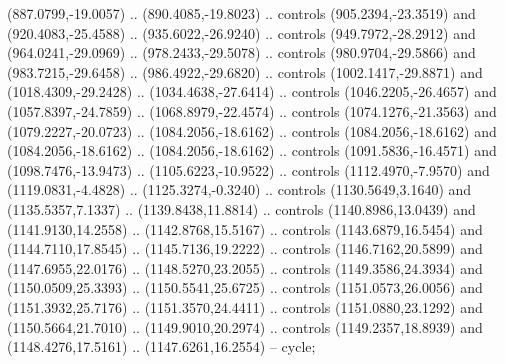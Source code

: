\begin{scope}[shift={(-22.88722,-49.76189)}]
\begin{scope}[shift={(-739.46591,328.36782)}]
      (887.0799,-19.0057) .. (890.4085,-19.8023) .. controls (905.2394,-23.3519) and
      (920.4083,-25.4588) .. (935.6022,-26.9240) .. controls (949.7972,-28.2912) and
      (964.0241,-29.0969) .. (978.2433,-29.5078) .. controls (980.9704,-29.5866) and
      (983.7215,-29.6458) .. (986.4922,-29.6820) .. controls (1002.1417,-29.8871)
      and (1018.4309,-29.2428) .. (1034.4638,-27.6414) .. controls
      (1046.2205,-26.4657) and (1057.8397,-24.7859) .. (1068.8979,-22.4574) ..
      controls (1074.1276,-21.3563) and (1079.2227,-20.0723) .. (1084.2056,-18.6162)
      .. controls (1084.2056,-18.6162) and (1084.2056,-18.6162) ..
      (1084.2056,-18.6162) .. controls (1091.5836,-16.4571) and (1098.7476,-13.9473)
      .. (1105.6223,-10.9522) .. controls (1112.4970,-7.9570) and
      (1119.0831,-4.4828) .. (1125.3274,-0.3240) .. controls (1130.5649,3.1640) and
      (1135.5357,7.1337) .. (1139.8438,11.8814) .. controls (1140.8986,13.0439) and
      (1141.9130,14.2558) .. (1142.8768,15.5167) .. controls (1143.6879,16.5454) and
      (1144.7110,17.8545) .. (1145.7136,19.2222) .. controls (1146.7162,20.5899) and
      (1147.6955,22.0176) .. (1148.5270,23.2055) .. controls (1149.3586,24.3934) and
      (1150.0509,25.3393) .. (1150.5541,25.6725) .. controls (1151.0573,26.0056) and
      (1151.3932,25.7176) .. (1151.3570,24.4411) .. controls (1151.0880,23.1292) and
      (1150.5664,21.7010) .. (1149.9010,20.2974) .. controls (1149.2357,18.8939) and
      (1148.4276,17.5161) .. (1147.6261,16.2554) -- cycle;


\end{scope}
\end{scope}
